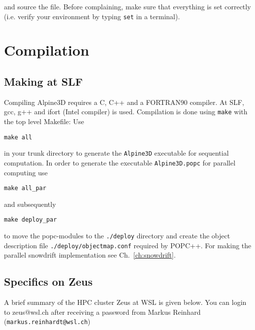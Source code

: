 \documentclass[12pt]{report}
\begin{document}
and source the file. Before complaining, make sure that everything is
set correctly (i.e. verify your environment by typing \verb+set+ in a
terminal).


\section{Compilation}

\subsection{Making at SLF}
Compiling Alpine3D requires a C, C++ and a FORTRAN90 compiler. At SLF,
gcc, g++ and ifort (Intel compiler) is used. Compilation is done using
\verb+make+ with the top level Makefile:
Use
\begin{verbatim}
make all
\end{verbatim}
in your trunk directory to generate the \verb+Alpine3D+ executable for
sequential computation. In order to generate the executable
\verb+Alpine3D.popc+ for parallel computing use
\begin{verbatim}
make all_par
\end{verbatim}
and subsequently
\begin{verbatim}
make deploy_par
\end{verbatim}
to move the popc-modules to the \verb+./deploy+ directory and create
the object description file \verb+./deploy/objectmap.conf+ required by
POPC++. For making the parallel snowdrift implementation see Ch.\
\ref{ch:snowdrift}.


\subsection{Specifics on Zeus}

A brief summary of the HPC cluster Zeus at WSL is given below. You
can login to zeus@wsl.ch after receiving a password from Markus
Reinhard \\(\verb+markus.reinhardt@wsl.ch+)
\end{document}
